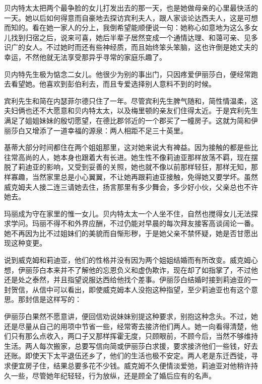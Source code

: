 \par 贝内特太太把两个最争脸的女儿打发出去的那一天，也是她做母亲的心里最快活的一天。她以后如何得意而自豪地去探访宾利夫人，跟人家谈论达西夫人，这是可想而知的。看在她一家人的分上，我倒希望能顺便说一句：她称心如意地为这么多女儿找到归宿之后，说来可喜，她后半辈子居然变成一个通情达理、和蔼可亲、见多识广的女人。不过她时而还有些神经质，而且始终笨头笨脑，这也许倒是她丈夫的幸运，不然他就无法享受那异乎寻常的家庭乐趣了。
\par 贝内特先生极为惦念二女儿。他很少为别的事出门，只因疼爱伊丽莎白，便经常跑去看望她。他喜欢到彭伯利去，而且专爱选择别人意料不到的时候。
\par 宾利先生和简在内瑟菲尔德只住了一年。尽管宾利先生脾气随和，简性情温柔，这夫妇俩也还不大愿意和贝内特太太，以及梅里顿的亲友们住得太近。于是宾利先生满足了姐姐妹妹的殷切愿望，在德比郡邻近的一个郡买了一幢房子。这就为简和伊丽莎白又增添了一道幸福的源泉：两人相距不足三十英里。
\par 基蒂大部分时间都住在两个姐姐那里，这对她来说大有裨益。因为接触的都是些比往常高尚的人，她本身也跟着大有长进。她生性不像莉迪亚那样放荡不羁，现在摆脱了莉迪亚的影响，又受到妥善的关照，她也就不像以前那样轻狂，那样无知，那样寡趣，当然家里总是小心翼翼，不让她再跟莉迪亚接触，免得她又要学坏。虽然威克姆夫人接二连三请她去住，扬言那里有多少舞会，多少好小伙，父亲总也不许她去。
\par 玛丽成为守在家里的惟一女儿。贝内特太太一个人坐不住，自然也搅得女儿无法探求学问。玛丽不得不和外界应酬，不过仍能对早晨的每次拜友接客高谈阔论一番。她不再因为比不过姐妹们的美貌而自惭形秽，于是她父亲不禁怀疑，她是否甘愿出现这种变更。
\par 说到威克姆和莉迪亚，他们的性格并没有因为两个姐姐结婚而有所改变。威克姆心想，伊丽莎白本来并不了解他的忘恩负义和虚伪欺诈，现在却了如指掌了，不过他还是处之泰然，并且指望说服达西给他找个差事。伊丽莎白结婚时接到莉迪亚的一封贺信，从信中可以看出，即使威克姆本人没抱这种指望，至少莉迪亚也有这个意思。那封信是这样写的：
\par 伊丽莎白果然不愿意讲，便回信劝说妹妹别提这种要求，别抱这种念头。不过，她还是尽量从自己的用项中节省一些，经常寄去接济他们两人。她一向看得清楚，他们只有那么点收入，两口子又那样挥霍无度，只顾眼前，不顾今后，当然不够维持生活。两人每次搬家，总要写信向简或伊丽莎白求援，要求接济他们一些钱，好去还账。即使天下太平退伍还乡了，他们的生活也极不安定。两人老是东迁西徙，寻求便宜房子住，结果总要多花不少钱。威克姆不久便情淡爱弛，莉迪亚对他稍许持久一些，尽管她年纪轻轻，行为放纵，还是顾全了婚后应有的名声。
